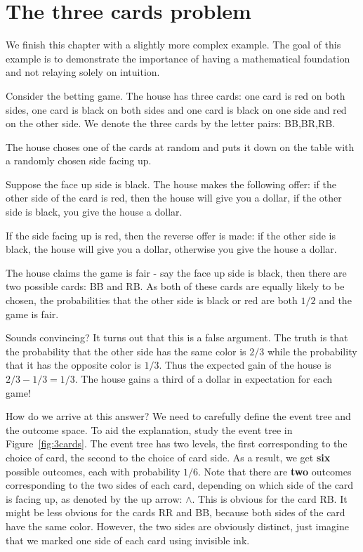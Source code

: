 \section{The three cards problem}

We finish this chapter with a slightly more complex example. The goal
of this example is to demonstrate the importance of having a
mathematical foundation and not relaying solely on intuition.

Consider the betting game. The house has three cards: one card is red
on both sides, one card is black on both sides and one card is black
on one side and red on the other side. We denote the three cards by
the letter pairs: BB,BR,RB.

The house choses one of the cards at random and puts it down on the
table with a randomly chosen side facing up.

Suppose the face up side is black. The house makes the following
offer: if the other side of the card is red, then the house will give
you a dollar, if the other side is black, you give the house a dollar.

If the side facing up is red, then the reverse offer is made: if the
other side is black, the house will give you a dollar, otherwise you
give the house a dollar.

The house claims the game is fair - say the face up side is black,
then there are two possible cards: BB and RB. As both of these cards
are equally likely to be chosen, the probabilities that the other side
is black or red are both $1/2$ and the game is fair.

Sounds convincing? It turns out that this is a false argument. The
truth is that the probability that the other side has the same color
is $2/3$ while the probability that it has the opposite color is
$1/3$. Thus the expected gain of the house is $2/3-1/3=1/3$. The house
gains a third of a dollar in expectation for each game!

How do we arrive at this answer? We need to carefully define the event
tree and the outcome space. To aid the explanation, study the event
tree in Figure~\ref{fig:3cards}. The event tree has two levels, the
first corresponding to the choice of card, the second to the choice of
card side. As a result, we get {\bf six} possible outcomes, each with
probability $1/6$. Note that there are {\bf two} outcomes
corresponding to the two sides of each card, depending on which side
of the card is facing up, as denoted by the up arrow: $\wedge$. This is
obvious for the card RB. It might be less obvious for the cards RR and
BB, because both sides of the card have the same color. However, the
two sides are obviously distinct, just imagine that we marked one side
of each card using invisible ink.

